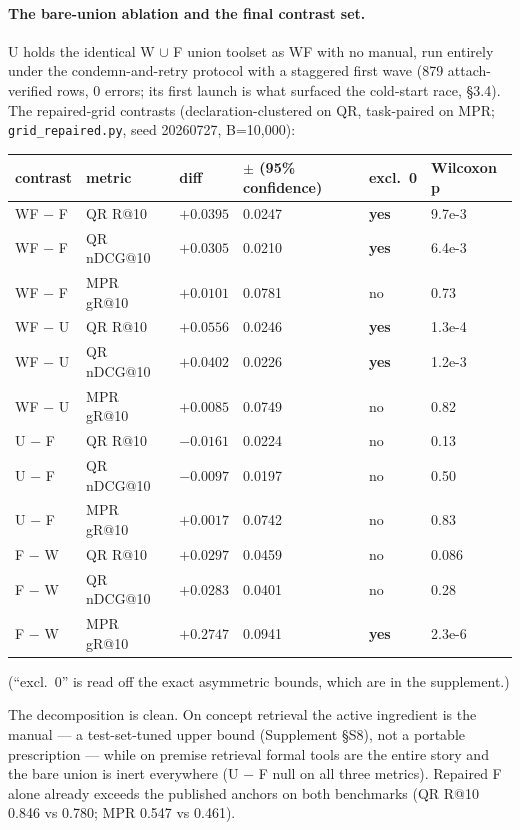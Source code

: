\documentclass[10pt]{article}
\newcommand{\code}[1]{\texttt{#1}}
\newcommand{\best}[1]{\textbf{#1}}
\newcommand{\Ssec}[1]{Supplement \S #1}
\begin{document}
\paragraph{The bare-union ablation and the final contrast set.} U holds
the identical W $\cup$ F union toolset as WF with no manual, run
entirely under the condemn-and-retry protocol with a staggered first
wave (879 attach-verified rows, 0 errors; its first launch is what
surfaced the cold-start race, \S 3.4). The repaired-grid contrasts
(declaration-clustered on QR, task-paired on MPR;
\code{grid\_repaired.py}, seed 20260727, B=10,000):

\begin{center}\footnotesize
\begin{tabular}{@{}llllll@{}}
\toprule
contrast & metric & diff & $\pm$ (95\% confidence) & excl.\ 0 & Wilcoxon p \\
\midrule
WF $-$ F & QR R@10 & $+0.0395$ & 0.0247 & \best{yes} & 9.7e-3 \\
WF $-$ F & QR nDCG@10 & $+0.0305$ & 0.0210 & \best{yes} & 6.4e-3 \\
WF $-$ F & MPR gR@10 & $+0.0101$ & 0.0781 & no & 0.73 \\
WF $-$ U & QR R@10 & $+0.0556$ & 0.0246 & \best{yes} & 1.3e-4 \\
WF $-$ U & QR nDCG@10 & $+0.0402$ & 0.0226 & \best{yes} & 1.2e-3 \\
WF $-$ U & MPR gR@10 & $+0.0085$ & 0.0749 & no & 0.82 \\
U $-$ F & QR R@10 & $-0.0161$ & 0.0224 & no & 0.13 \\
U $-$ F & QR nDCG@10 & $-0.0097$ & 0.0197 & no & 0.50 \\
U $-$ F & MPR gR@10 & $+0.0017$ & 0.0742 & no & 0.83 \\
F $-$ W & QR R@10 & $+0.0297$ & 0.0459 & no & 0.086 \\
F $-$ W & QR nDCG@10 & $+0.0283$ & 0.0401 & no & 0.28 \\
F $-$ W & MPR gR@10 & $+0.2747$ & 0.0941 & \best{yes} & 2.3e-6 \\
\bottomrule
\end{tabular}
\end{center}

\noindent(``excl.\ 0'' is read off the exact asymmetric bounds, which
are in the supplement.)

The decomposition is clean. On concept retrieval the active ingredient
is the manual --- a test-set-tuned upper bound (\Ssec{S8}), not a
portable prescription --- while on premise retrieval formal tools are
the entire story and the bare union is inert everywhere (U $-$ F null on
all three metrics). Repaired F alone already exceeds the published
anchors on both benchmarks (QR R@10 0.846 vs 0.780; MPR 0.547 vs
0.461).
\end{document}
